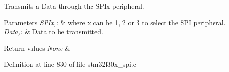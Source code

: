 Transmits a Data through the S\-P\-Ix peripheral. 


\begin{DoxyParams}{Parameters}
{\em S\-P\-Ix,\-:} & where x can be 1, 2 or 3 to select the S\-P\-I peripheral. \\
\hline
{\em Data,\-:} & Data to be transmitted. \\
\hline
\end{DoxyParams}

\begin{DoxyRetVals}{Return values}
{\em None} & \\
\hline
\end{DoxyRetVals}


Definition at line 830 of file stm32f30x\-\_\-spi.\-c.

